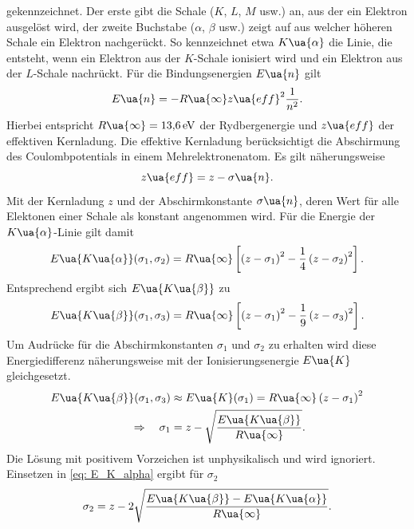 gekennzeichnet. Der erste gibt die Schale ($K$, $L$, $M$ usw.) an, aus der ein Elektron ausgelöst wird, der zweite Buchstabe
($\alpha$, $\beta$ usw.) zeigt auf aus welcher höheren Schale ein Elektron nachgerückt. So kennzeichnet etwa
$K\ua{\alpha}$ die Linie, die entsteht, wenn ein Elektron aus der $K$-Schale ionisiert wird und ein Elektron aus der $L$-Schale
nachrückt. Für die Bindungsenergien $E\ua{n}$ gilt
\begin{equation}
  E\ua{n} = -R\ua{\infty} z\ua{eff}^2 \frac{1}{n^2}.
  \label{eq: E_niveaus}
\end{equation}
Hierbei entspricht $R\ua{\infty} = \SI{13.6}{\eV}$ der Rydbergenergie und $z\ua{eff}$ der effektiven Kernladung. Die effektive
Kernladung berücksichtigt die Abschirmung des Coulombpotentials in einem Mehrelektronenatom. Es gilt näherungsweise
\begin{equation}
  z\ua{eff} = z - \sigma\ua{n}.
  \label{eq: abschirmkonstante}
\end{equation}
Mit der Kernladung $z$ und der Abschirmkonstante $\sigma\ua{n}$, deren Wert für alle Elektonen einer Schale als konstant angenommen wird.
Für die Energie der $K\ua{\alpha}$-Linie gilt damit
\begin{equation}
  E\ua{K\ua{\alpha}}(\sigma_1, \sigma_2) = R\ua{\infty} \left[\left(z - \sigma_1\right)^2 -  \frac{1}{4}\left(z - \sigma_2\right)^2\right].
  \label{eq: E_K_alpha}
\end{equation}
Entsprechend ergibt sich $E\ua{K\ua{\beta}}$ zu
\begin{equation}
  E\ua{K\ua{\beta}}(\sigma_1, \sigma_3) = R\ua{\infty} \left[\left(z - \sigma_1\right)^2 -  \frac{1}{9}\left(z - \sigma_3\right)^2\right].
  \label{eq: E_K_beta}
\end{equation}
Um Audrücke für die Abschirmkonstanten $\sigma_1$ und $\sigma_2$ zu erhalten wird diese Energiedifferenz
näherungsweise mit der Ionisierungsenergie $E\ua{K}$ gleichgesetzt.
\begin{align}
  \begin{aligned}
  E\ua{K\ua{\beta}}(\sigma_1, \sigma_3) &\approx E\ua{K}(\sigma_1) = R\ua{\infty} \left(z - \sigma_1\right)^2 \\
  \Rightarrow \quad \sigma_1 &= z - \sqrt{\frac{E\ua{K\ua{\beta}}}{R\ua{\infty}}}.
  \label{eq: sigma_1}
\end{aligned}
\end{align}
Die Lösung mit positivem Vorzeichen ist unphysikalisch und wird ignoriert. Einsetzen in \eqref{eq: E_K_alpha} ergibt für $\sigma_2$
\begin{equation}
  \sigma_2 = z - 2\sqrt{\frac{ E\ua{K\ua{\beta}} - E\ua{K\ua{\alpha}} }{ R\ua{\infty} } }.
  \label{eq: sigma_2}
\end{equation}

